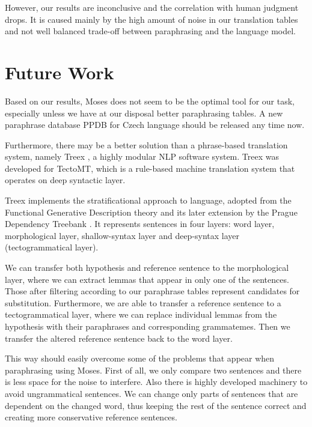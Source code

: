 However, our results are inconclusive and the correlation with human judgment
drops. It is caused mainly by the high amount of noise in our translation tables and
not well balanced trade-off between paraphrasing and the language model.


\section{Future Work}
Based on our results, Moses does not seem to be the optimal tool for our task, especially
unless we have at our disposal better paraphrasing tables. A new paraphrase database 
PPDB \cite{ppdb} for Czech language should be released any time now. 

Furthermore, there may be a better solution than a phrase-based translation
system, namely Treex \cite{treex}, a highly modular NLP software system. Treex
was developed for TectoMT, which is a rule-based machine translation system that
operates on deep syntactic layer.

Treex implements the stratificational approach to language, adopted from the 
Functional Generative Description theory \cite{FGP} and its later extension by the 
Prague Dependency Treebank \cite{PDT3.0}. It represents sentences in four layers:
word layer, morphological layer, shallow-syntax layer and deep-syntax layer 
(tectogrammatical layer).

We can transfer both hypothesis and reference sentence to the morphological layer, 
where we can extract lemmas that appear in only one of the sentences. Those after
filtering according to our paraphrase tables represent candidates for substitution.
Furthermore, we are able to transfer a reference sentence to a tectogrammatical 
layer, where we can replace individual lemmas from the hypothesis with their paraphrases 
and corresponding grammatemes. Then we transfer the altered reference sentence back to 
the word layer.

This way should easily overcome some of the problems that appear when paraphrasing using 
Moses. First of all, we only compare two sentences and there is less space for %
the noise to interfere. Also there is highly developed machinery to avoid ungrammatical 
sentences. We can change only parts of sentences that are dependent on the changed 
word, thus keeping the rest of the sentence correct and creating more conservative 
reference sentences.

